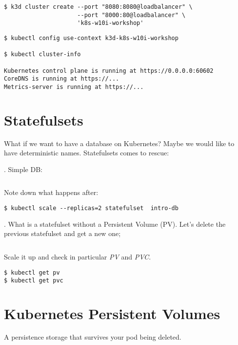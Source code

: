 \documentclass[12pt, letterpaper]{article}
\begin{document}
\begin{verbatim}
$ k3d cluster create --port "8080:8080@loadbalancer" \
                     --port "8000:80@loadbalancer" \
                     'k8s-w10i-workshop'
\end{verbatim}

\begin{verbatim}
$ kubectl config use-context k3d-k8s-w10i-workshop

$ kubectl cluster-info

Kubernetes control plane is running at https://0.0.0.0:60602
CoreDNS is running at https://...
Metrics-server is running at https://...
\end{verbatim}

\section{Statefulsets}
What if we want to have a database on Kubernetes? Maybe we would like to have deterministic names. Statefulsets comes to rescue:

. Simple DB:

\inputminted[frame=single]{yaml}{manifests/statefulsets/kube-statefulsets.yaml}

\bigskip
Note down what happens after:

\begin{verbatim}
$ kubectl scale --replicas=2 statefulset  intro-db
\end{verbatim}

. What is a statefulset without a Persistent Volume ({\small PV}). Let's delete the previous statefulset and get a new one;

\inputminted[frame=single]{yaml}{manifests/statefulsets/kube-statefulsets-vct.yaml}

\bigskip
Scale it up and check in particular \emph{PV} and \emph{PVC}.
\begin{verbatim}
$ kubectl get pv
$ kubectl get pvc
\end{verbatim}

\section{Kubernetes Persistent Volumes}

A persistence storage that survives your pod being deleted.
\end{document}
